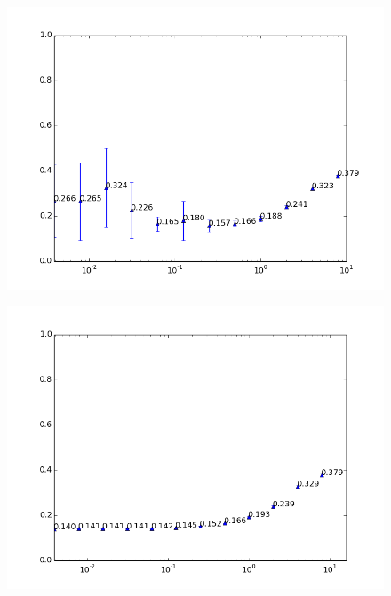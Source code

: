 \begin{figure}[h!]
	\centering
	\begin{minipage}{.49\linewidth}
		\includegraphics[width=\linewidth]{fig/spambase/eps0.1,budg=eps,peers10,groups10,reg2e-8-2e3-data368-pubAll-spam-baseline-testset}
		\label{fig:regularization_normalepsilon}
	\end{minipage}
	\hspace{.001\linewidth}
	\begin{minipage}{.49\linewidth}
		\includegraphics[width=\linewidth]{fig/spambase/eps2e10,budg=eps,peers10,groups10,reg2e-8-2e3-data368-pubAll-spam-baseline-testset}
		\label{fig:regularization_extremelyhighepsilon}
	\end{minipage}
\end{figure}

